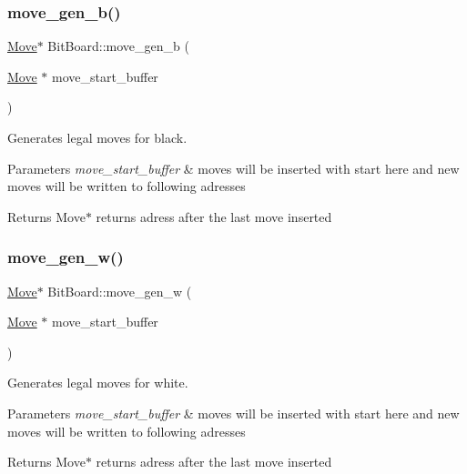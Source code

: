 \subsubsection{\texorpdfstring{move\+\_\+gen\+\_\+b()}{move\_gen\_b()}}
{\footnotesize\ttfamily \hyperlink{structMove}{Move}$\ast$ Bit\+Board\+::move\+\_\+gen\+\_\+b (\begin{DoxyParamCaption}\item[{\hyperlink{structMove}{Move} $\ast$}]{move\+\_\+start\+\_\+buffer }\end{DoxyParamCaption})\hspace{0.3cm}{\ttfamily [inline]}}



Generates legal moves for black. 


\begin{DoxyParams}{Parameters}
{\em move\+\_\+start\+\_\+buffer} & moves will be inserted with start here and new moves will be written to following adresses \\
\hline
\end{DoxyParams}
\begin{DoxyReturn}{Returns}
Move$\ast$ returns adress after the last move inserted 
\end{DoxyReturn}
\mbox{\label{classBitBoard_a1367722f40d889d95acdb6224cc34205}} 
\subsubsection{\texorpdfstring{move\+\_\+gen\+\_\+w()}{move\_gen\_w()}}
{\footnotesize\ttfamily \hyperlink{structMove}{Move}$\ast$ Bit\+Board\+::move\+\_\+gen\+\_\+w (\begin{DoxyParamCaption}\item[{\hyperlink{structMove}{Move} $\ast$}]{move\+\_\+start\+\_\+buffer }\end{DoxyParamCaption})\hspace{0.3cm}{\ttfamily [inline]}}



Generates legal moves for white. 


\begin{DoxyParams}{Parameters}
{\em move\+\_\+start\+\_\+buffer} & moves will be inserted with start here and new moves will be written to following adresses \\
\hline
\end{DoxyParams}
\begin{DoxyReturn}{Returns}
Move$\ast$ returns adress after the last move inserted 
\end{DoxyReturn}
\mbox{\label{classBitBoard_a9a020e6d88fdedce0de800680abec2e7}} 
